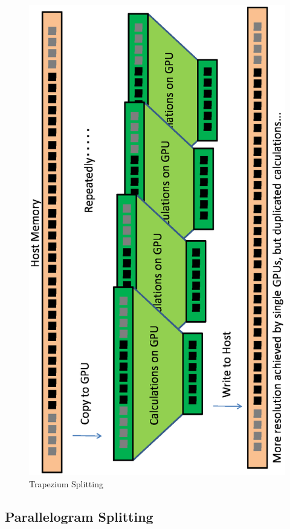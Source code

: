 \documentclass[twocolumn]{article}
\begin{document}
\begin{figure}
  \includegraphics[scale=0.5,angle=270]{figure/trapezium.eps}
  \caption{Trapezium Splitting}\label{FigureTrapezium}
\end{figure}

\subsection{Parallelogram Splitting}
\end{document}
